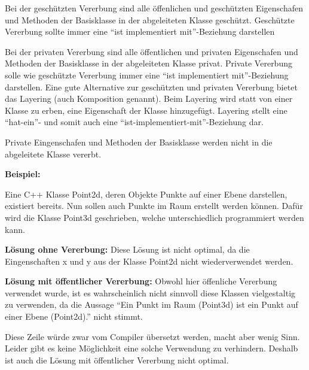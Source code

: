 			Bei der geschützten Vererbung sind alle öffenlichen und geschützten Eigenschafen und Methoden der Basisklasse in
			der abgeleiteten Klasse geschützt. Geschützte Vererbung sollte immer eine ``ist implementiert mit''-Beziehung darstellen
			
			Bei der privaten Vererbung sind alle öffentlichen und privaten Eigenschafen und Methoden der Basisklasse in der
			abgeleiteten Klasse privat.
			Private Vererbung solle wie geschützte Vererbung immer eine ``ist implementiert mit''-Beziehung darstellen.
			Eine gute Alternative zur geschützten und privaten Vererbung bietet das Layering (auch Komposition genannt). Beim
			Layering wird statt von einer Klasse zu erben, eine Eigenschaft
			der Klasse hinzugefügt. Layering stellt eine ``hat-ein''- und somit auch eine ``ist-implementiert-mit''-Beziehung dar.
			
			Private Eingenschafen und Methoden der Basisklasse werden nicht in die abgeleitete Klasse vererbt.
			
			{\bfseries Beispiel:}
		
			\UseRawInputEncoding{}
			Eine C++ Klasse Point2d, deren Objekte Punkte auf einer Ebene darstellen, existiert bereits. Nun sollen auch Punkte im Raum
			erstellt werden können. Dafür wird die Klasse Point3d geschrieben, welche unterschiedlich programmiert werden kann.
			
			{\bfseries Lösung ohne Vererbung:}
			\UseRawInputEncoding{}
			Diese Lösung ist nicht optimal, da die Eingenschaften x und y aus der Klasse Point2d nicht wiederverwendet werden.
			
			{\bfseries Lösung mit öffentlicher Vererbung:}
			\UseRawInputEncoding{}
			Obwohl hier öffenliche Vererbung verwendet wurde, ist es wahrscheinlich nicht sinnvoll diese Klassen vielgestaltig zu verwenden, da die
			Aussage ``Ein Punkt im Raum (Point3d) ist ein Punkt auf einer Ebene (Point2d).'' nicht stimmt.
			
			\UseRawInputEncoding{}
			Diese Zeile würde zwar vom Compiler übersetzt werden, macht aber wenig Sinn. Leider gibt es keine Möglichkeit eine
			solche Verwendung zu verhindern. Deshalb ist auch die Lösung mit öffentlicher Vererbung nicht optimal.
			
